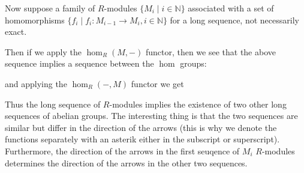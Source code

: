 Now suppose a family of $R$-modules $\{M_i \mid i \in \mathbb{N}\}$ associated with a
set of homomorphisms $\{f_i \mid f_i :M_{i-1} \to M_i, i
\in \mathbb{N}\}$ for a long sequence, not necessarily exact.
\begin{center}
\end{center}
Then if we apply the $\hom_R(M, -)$ functor,
then we see that the above sequence implies a sequence between the
$\hom$ groups:
\begin{center}
\end{center}
and applying the $\hom_R(-, M)$ functor we get 
\begin{center}
\end{center}

Thus the long sequence of $R$-modules implies the existence of two other long
sequences of abelian groups. The interesting thing is that the two sequences are
similar but differ in the direction of the arrows (this is why we
denote the functions separately with an asterik either in the
subscript or superscript). Furthermore,
the direction of the arrows in the first seuqence of $M_i$
$R$-modules determines the direction of the arrows in the other
two sequences. 

